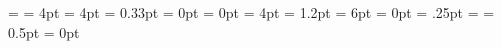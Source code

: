 \boxmaxdepth = \maxdimen        %
\delimitershortfall = 4pt       %
\emergencystretch = 4pt         %
\hfuzz = 0.33pt                 %
\hoffset = 0pt                  %
\zremovePlaindef \jot
{}         %
\lineskiplimit = 0pt            %
\let \linewidth = \hsize        %
\maxdepth = 4pt                 %
\zremovePlaindef \normallineskiplimit
{} %
\nulldelimiterspace = 1.2pt             %
\overfullrule = 6pt             %
\parindent = 0pt                %
\scriptspace = .25pt            %
\splitmaxdepth = \maxdimen      %
\let \textareawidth = \textmeasure
{}            %
\vfuzz = 0.5pt                  %
\voffset = 0pt                  %

